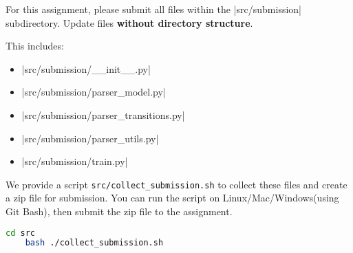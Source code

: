 \begin{enumerate}[(a)]
    For this assignment, please submit all files within the |src/submission| subdirectory. Update files \textbf{without directory structure}.
    
    This includes:
    
    \begin{itemize}
        \item |src/submission/__init__.py|
        \item |src/submission/parser_model.py|
        \item |src/submission/parser_transitions.py|
        \item |src/submission/parser_utils.py|
        \item |src/submission/train.py|
    \end{itemize}   

We provide a script \texttt{src/collect\_submission.sh} to collect these files and create a zip file for submission. You can run the script on Linux/Mac/Windows(using Git Bash), then submit the zip file to the assignment.

\begin{lstlisting}[language=bash]
    cd src
    bash ./collect_submission.sh
\end{lstlisting}
\end{enumerate}
